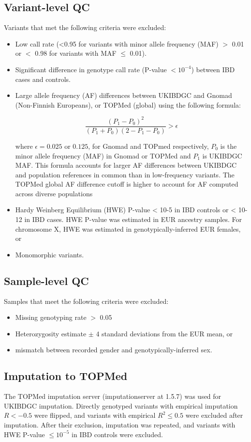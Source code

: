 \subsection{Variant-level QC}
Variants that met the following criteria were excluded: 
\begin{itemize}
  \item Low call rate (<0.95 for variants with minor allele frequency (MAF) $>$ 0.01 or $<$ 0.98 for variants with MAF $\leq$ 0.01).
  \item Significant difference in genotype call rate (P-value $< 10^{-4}$) between IBD cases and controls.
  \item Large allele frequency (AF) differences between UKIBDGC and Gnomad (Non-Finnish Europeans), or TOPMed (global) using the following formula:

$$\frac{(P_{1}-P_{0})^{2}}{(P_{1}+P_{0})(2-P_{1}-P_{0})} > \epsilon$$ 


where $\epsilon=0.025$ or $0.125$, for Gnomad and TOPmed respectively,  $P_{0}$ is the minor allele frequency (MAF) in Gnomad or TOPMed and $P_{1}$ is UKIBDGC MAF. This formula accounts for larger AF differences between UKIBDGC and population references in common than in low-frequency variants. The TOPMed global AF difference cutoff is higher to account for AF computed across diverse populations
\item Hardy Weinberg Equilibrium (HWE) P-value < 10-5 in IBD controls or < 10-12 in IBD cases. HWE P-value was estimated in EUR ancestry samples. For chromosome X, HWE was estimated in genotypically-inferred EUR females, or 
\item Monomorphic variants. 
\end{itemize}

\subsection{Sample-level QC}
Samples that meet the following criteria were excluded:
\begin{itemize}
\item Missing genotyping rate $>$ 0.05
\item Heterozygosity estimate $\pm$ 4 standard deviations from the EUR mean, or 
\item mismatch between recorded gender and genotypically-inferred sex. 
\end{itemize}
\subsection{Imputation to TOPMed}
The TOPMed imputation server (imputationserver at 1.5.7) was used for UKIBDGC imputation. Directly genotyped variants with empirical imputation $R < -0.5$ were flipped, and variants with empirical $R^{2} \leq 0.5$ were excluded after imputation. After their exclusion, imputation was repeated, and variants with HWE P-value $\leq 10^{-5}$ in IBD controls were excluded.

